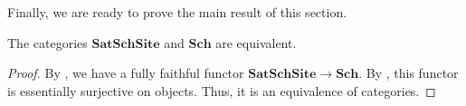 \documentclass[reqno]{amsart}
\theoremstyle{definition}
\theoremstyle{remark}
\numberwithin{figure}{section}
\newcommand{\cat}[1]{\mathbf{#1}}
\begin{document}
Finally, we are ready to prove the main result of this section.

\begin{thm}[main]
The categories $\cat{SatSchSite}$ and $\cat{Sch}$ are equivalent.
\end{thm}
\begin{proof}
By , we have a fully faithful functor $\cat{SatSchSite} \to \cat{Sch}$.
By , this functor is essentially surjective on objects.
Thus, it is an equivalence of categories.
\end{proof}



\end{document}
